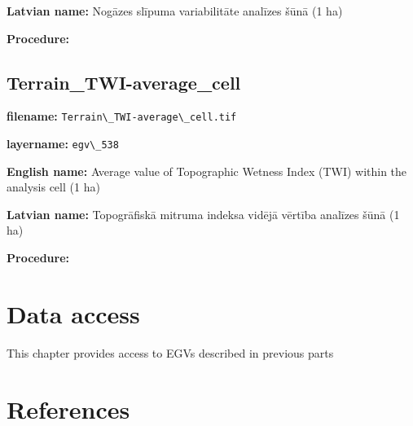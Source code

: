 \documentclass[
]{book}
\newcommand{\passthrough}[1]{#1}
\begin{document}
\textbf{Latvian name:} Nogāzes slīpuma variabilitāte analīzes šūnā (1 ha)

\textbf{Procedure:}

\section{Terrain\_TWI-average\_cell}\label{ch06.538}

\textbf{filename:} \passthrough{\lstinline!Terrain\_TWI-average\_cell.tif!}

\textbf{layername:} \passthrough{\lstinline!egv\_538!}

\textbf{English name:} Average value of Topographic Wetness Index (TWI) within the analysis cell (1 ha)

\textbf{Latvian name:} Topogrāfiskā mitruma indeksa vidējā vērtība analīzes šūnā (1 ha)

\textbf{Procedure:}

\chapter{Data access}\label{Ch07}

This chapter provides access to EGVs described in previous parts

\chapter*{References}\label{references}
\end{document}
